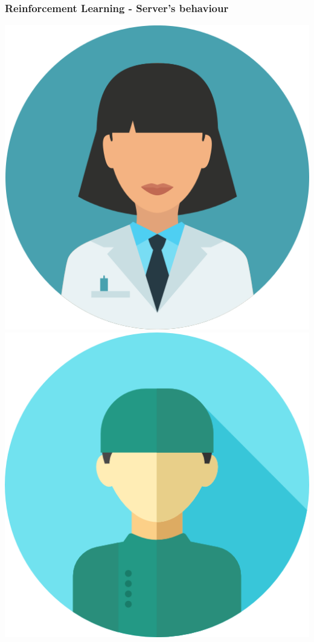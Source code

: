 \begin{frame}
    \frametitle{Reinforcement Learning - Server's behaviour}
    \centering

    \includegraphics[scale=0.08]{Bin/staff_avatars/doctor_1.png}
    \hspace{0.4cm}
    \includegraphics[scale=0.1]{Bin/staff_avatars/doctor_2.png}

\end{frame}
